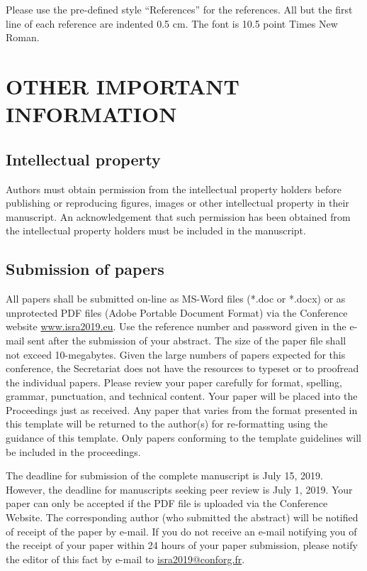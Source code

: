 Please use the pre-defined style ``References'' for the references. All but the first line of each reference are indented 0.5 cm. The font is 10.5 point Times New Roman.

\section{\uppercase{Other important information}}

\subsection{Intellectual property}

Authors must obtain permission from the intellectual property holders before publishing or reproducing figures, images or other intellectual property in their manuscript. An acknowledgement that such permission has been obtained from the intellectual property holders must be included in the manuscript.

\subsection{Submission of papers}

All papers shall be submitted on-line as MS-Word files (*.doc or *.docx) or as unprotected PDF files (Adobe Portable Document Format) via the Conference website \url{www.isra2019.eu}. Use the reference number and password given in the e-mail sent after the submission of your abstract. The size of the paper file shall not exceed 10-megabytes. Given the large numbers of papers expected for this conference, the Secretariat does not have the resources to typeset or to proofread the individual papers. Please review your paper carefully for format, spelling, grammar, punctuation, and technical content. Your paper will be placed into the Proceedings just as received. Any paper that varies from the format presented in this template will be returned to the author(s) for re-formatting using the guidance of this template. Only papers conforming to the template guidelines will be included in the proceedings.

The deadline for submission of the complete manuscript is July 15, 2019. However, the deadline for manuscripts seeking peer review is July 1, 2019. Your paper can only be accepted if the PDF file is uploaded via the Conference Website. The corresponding author (who submitted the abstract) will be notified of receipt of the paper by e-mail. If you do not receive an e-mail notifying you of the receipt of your paper within 24 hours of your paper submission, please notify the editor of this fact by e-mail to \href{mailto:isra2019@conforg.fr}{isra2019@conforg.fr}.

